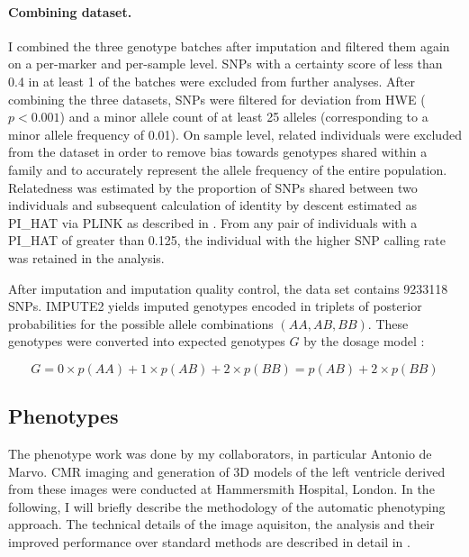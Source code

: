 \paragraph{Combining dataset.} I combined the three genotype batches after imputation and filtered them again on a per-marker and per-sample level. SNPs with a certainty score of less than \num{0.4} in at least \num{1} of the batches were excluded from further analyses. After combining the three datasets, SNPs were filtered for deviation from HWE (\(p <0.001\)) and a minor allele count of at least \num{25} alleles (corresponding to a minor allele frequency of \num{0.01}).  On sample level, related individuals were excluded from the dataset in order to remove bias towards genotypes shared within a family and to accurately represent the allele frequency of the entire population. Relatedness was estimated by the proportion of SNPs shared between two individuals and subsequent calculation of identity by descent estimated as PI\_HAT via PLINK as described in \citep{Anderson2010}. From any pair of individuals with a PI\_HAT of greater than \num{0.125}, the individual with the higher SNP calling rate was retained in the analysis. 

After imputation and imputation quality control, the data set contains \num{9233118} SNPs. IMPUTE2 yields imputed genotypes encoded in triplets of posterior probabilities for the possible allele combinations \((AA, AB, BB)\). These genotypes were converted into expected genotypes \(G\) by the dosage model \citep{Howie2011}:

\begin{equation}
	G = 0 \times p(AA) + 1 \times p(AB) + 2 \times p(BB) = p(AB) + 2 \times p(BB)
\end{equation}


\subsection{Phenotypes}
The phenotype work was done by my collaborators, in particular Antonio de Marvo. CMR imaging and generation of 3D models of the left ventricle derived from these images were conducted at Hammersmith Hospital, London. In the following, I will briefly describe the methodology of the automatic phenotyping approach. The technical details of the image aquisiton, the analysis and their improved performance over standard methods are described in detail in \citep{DeMarvao2014}. 


